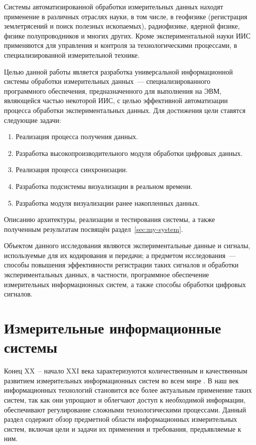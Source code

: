 \documentclass[a4paper, 14pt, titlepage]{extarticle}
\let\oldsection\section
\renewcommand{\section}{\newpage\oldsection}
\begin{document}
  Системы автоматизированной обработки измерительных данных находят применение в различных отраслях науки,
  в том числе, в геофизике (регистрация землетрясений и поиск полезных ископаемых), радиофизике,
  ядерной физике, физике полупроводников и многих других. Кроме экспериментальной науки ИИС
  применяются для управления и контроля за технологическими процессами, в специализированной
  измерительной технике.

  Целью данной работы является разработка универсальной информационной системы обработки
  измерительных данных~--- специализированного программного обеспечения, предназначенного для
  выполнения на ЭВМ, являющейся частью некоторой ИИС, с целью эффективной автоматизации процесса
  обработки экспериментальных данных. Для достижения цели ставятся следующие задачи:
  \begin{enumerate}
    \item Реализация процесса получения данных.
    \item Разработка высокопроизводительного модуля обработки цифровых данных.
    \item Реализация процесса синхронизации. %
    \item Разработка подсистемы визуализации в реальном времени.
    \item Разработка модуля визуализации ранее накопленных данных.
  \end{enumerate}
  Описанию архитектуры, реализации и тестирования системы, а также полученным результатам посвящён раздел~\ref{sec:my-system}.

  Объектом данного исследования являются экспериментальные данные и сигналы, используемые для их
  кодирования и передачи; а предметом исследования~--- способы повышения эффективности регистрации
  таких сигналов и обработки экспериментальных данных, в частности, программное обеспечение
  измерительных информационных систем, а также способы обработки цифровых сигналов.


  \section{Измерительные информационные системы}\label{sec:iis}


  Конец XX~-- начало XXI века характеризуются количественным и качественным развитием измерительных
  информационных систем во всем мире \cite[с.~3]{rannev-iis}. В наш век информационных
  технологий становится все более актуальным применение таких систем, так как они упрощают и облегчают доступ
  к необходимой информации, обеспечивают регулирование сложными технологическими процессами.
  Данный раздел содержит обзор предметной области информационных измерительных систем, включая цели
  и задачи их применения и требования, предъявляемые к ним.
\end{document}
